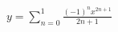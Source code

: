 \documentclass[preview]{standalone}
\begin{document}
\begin{align*}
y = \sum_{n=0}^{1} \frac{(-1)^n x^{2n+1}}{2n+1}
\end{align*}
\end{document}
